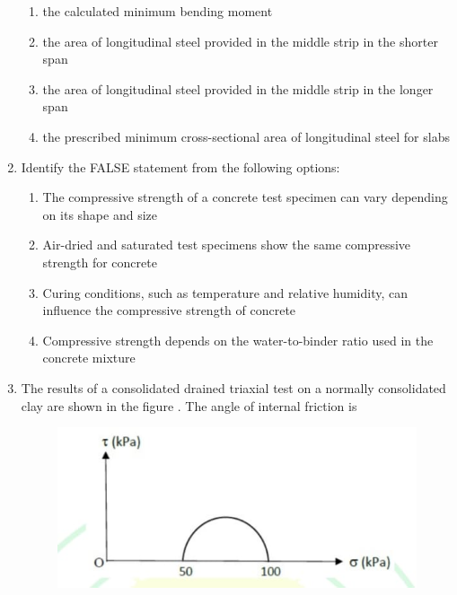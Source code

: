\documentclass[journal,12pt,onecolumn]{article}
\theoremstyle{remark}
\begin{document}
\begin{enumerate}
\hfill{}
\begin{enumerate}
    \item the calculated minimum bending moment
    \item the area of longitudinal steel provided in the middle strip in the shorter span
    \item the area of longitudinal steel provided in the middle strip in the longer span
    \item the prescribed minimum cross-sectional area of longitudinal steel for slabs
\end{enumerate}

\item Identify the FALSE statement from the following options:

\hfill{}
\begin{enumerate}
    \item The compressive strength of a concrete test specimen can vary depending on its shape and size
    \item Air-dried and saturated test specimens show the same compressive strength for concrete
    \item Curing conditions, such as temperature and relative humidity, can influence the compressive strength of concrete
    \item Compressive strength depends on the water-to-binder ratio used in the concrete mixture
\end{enumerate}

\item The results of a consolidated drained triaxial test on a normally consolidated clay are shown in the figure . The angle of internal friction is
\begin{figure}[H]
    \centering
    \includegraphics[width=0.7\columnwidth]{figs/1q-17.jpg}
    \caption{}
    \label{fig:q17}
\end{figure}

\hfill{}
\begin{enumerate}
\end{enumerate}


\end{enumerate}
\end{document}
